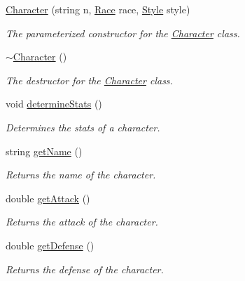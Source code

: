 \begin{DoxyCompactItemize}
\item 
\mbox{\hyperlink{class_character_a71950bfb551c8e3ab688156808286331}{Character}} (string n, \mbox{\hyperlink{class_race}{Race}} race, \mbox{\hyperlink{class_style}{Style}} style)
\begin{DoxyCompactList}\small\item\em The parameterized constructor for the \mbox{\hyperlink{class_character}{Character}} class. \end{DoxyCompactList}\item 
\mbox{\label{class_character_a9e9be564d05ded80962b2045aa70b3fc}} 
\mbox{\hyperlink{class_character_a9e9be564d05ded80962b2045aa70b3fc}{$\sim$\+Character}} ()
\begin{DoxyCompactList}\small\item\em The destructor for the \mbox{\hyperlink{class_character}{Character}} class. \end{DoxyCompactList}\item 
\mbox{\label{class_character_a6f933f9865269a0302297f6b50c5e636}} 
void \mbox{\hyperlink{class_character_a6f933f9865269a0302297f6b50c5e636}{determine\+Stats}} ()
\begin{DoxyCompactList}\small\item\em Determines the stats of a character. \end{DoxyCompactList}\item 
string \mbox{\hyperlink{class_character_ac2277578bac771149e518e3d5652807c}{get\+Name}} ()
\begin{DoxyCompactList}\small\item\em Returns the name of the character. \end{DoxyCompactList}\item 
double \mbox{\hyperlink{class_character_a10103c3d082351807a06dc758b49ca4e}{get\+Attack}} ()
\begin{DoxyCompactList}\small\item\em Returns the attack of the character. \end{DoxyCompactList}\item 
double \mbox{\hyperlink{class_character_a9cfa4e4ca2a08b794c3b6c463d2d57b0}{get\+Defense}} ()
\begin{DoxyCompactList}\small\item\em Returns the defense of the character. \end{DoxyCompactList}\item 

\end{DoxyCompactItemize}
